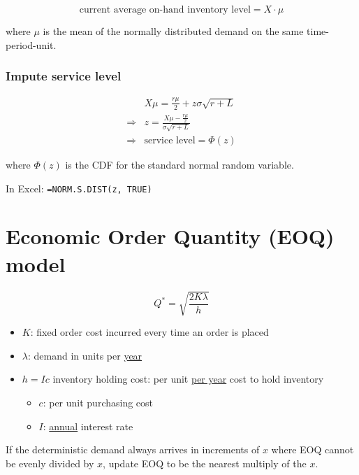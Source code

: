 \documentclass[11pt]{article}
\begin{document}
\begin{equation}
    \text{current average on-hand inventory level} = X \cdot \mu
\end{equation}

where $\mu$ is the mean of the normally distributed demand on the same time-period-unit.

\subsubsection{Impute service level}

\begin{equation}
\begin{split}
    &X \mu = \frac{r \mu}{2} + z \sigma \sqrt{r + L} \\
    \Rightarrow& z = \frac{X \mu - \frac{r \mu}{2}}{\sigma \sqrt{r + L}}\\
    \Rightarrow& \text{service level} = \Phi(z)
\end{split}
\end{equation}

where $\Phi(z)$ is the CDF for the standard normal random variable.

In Excel: \texttt{=NORM.S.DIST(z, TRUE)}

\section{Economic Order Quantity (EOQ) model}

\begin{equation}
    Q^* = \sqrt{\frac{2K\lambda}{h}}
\end{equation}

\begin{itemize}
    \item $K$: fixed order cost incurred every time an order is placed
    \item $\lambda$: demand in units per \underline{year}
    \item $h = Ic$ inventory holding cost: per unit \underline{per year} cost to hold inventory\begin{itemize}
        \item $c$: per unit purchasing cost
        \item $I$: \underline{annual} interest rate
    \end{itemize}
\end{itemize}

If the deterministic demand always arrives in increments of $x$ where EOQ cannot be evenly divided by $x$, update EOQ to
be the nearest multiply of the $x$.
\end{document}
